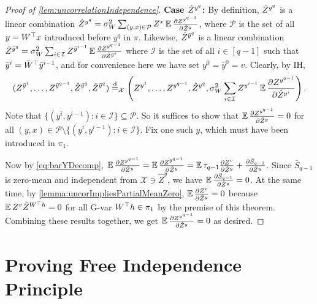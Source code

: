 \documentclass[main.tex]{subfiles}
\begin{document}
\begin{proof}[Proof of \cref{lem:uncorrelationIndependence}]
    \textbf{Case $\dot Z^{y^{q}}$: }By definition, $\dot Z^{y^{q}}$ is a linear combination $\dot Z^{y^{q}}=\sigma_{W}^{2}\sum_{(y,x)\in\mathcal{P}}Z^{x}\operatorname*{\mathbb{E}}\frac{\partial Z^{y^{q-1}}}{\partial\hat{Z}^{y}}$, where $\mathcal{P}$ is the set of all $y=W^{\top}x$ introduced before $y^{q}$ in $\pi$. Likewise, $\dot Z^{\bar{y}^{q}}$ is a linear combination $\dot Z^{\bar{y}^{q}}=\sigma_{W}^{2}\sum_{i\in\mathcal{I}}Z^{\bar{y}^{i-1}}\operatorname*{\mathbb{E}}\frac{\partial Z^{\bar{y}^{q-1}}}{\partial\hat{Z}^{\bar{y}^{i}}}$ where $\mathcal{I}$ is the set of all $i\in[q-1]$ such that $\bar{y}^{i}=\bar{W}^{\top}\bar{y}^{i-1}$, and for convenience here we have set $y^{0}=\bar{y}^{0}=v$. Clearly, by IH, 
    \[
    (Z^{\bar{y}^{1}},\ldots,Z^{\bar{y}^{q-1}},\hat{Z}^{\bar{y}^{q}},\dot Z^{\bar{y}^{q}})\overset{\mathrm{d}}{=}_{\mathcal{X}}\left(Z^{y^{1}},\ldots,Z^{y^{q-1}},\hat{Z}^{y^{q}},\sigma_{W}^{2}\sum_{i\in\mathcal{I}}Z^{y^{i-1}}\operatorname*{\mathbb{E}}\frac{\partial Z^{y^{q-1}}}{\partial\hat{Z}^{y^{i}}}\right).
    \]
    Note that $\{(y^{i},y^{i-1}):i\in\mathcal{I}\}\subseteq\mathcal{P}$. So it suffices to show that $\operatorname*{\mathbb{E}}\frac{\partial Z^{y^{q-1}}}{\partial\hat{Z}^{y}}=0$ for all $(y,x)\in\mathcal{P}\setminus\{(y^{i},y^{i-1}):i\in\mathcal{I}\}$. Fix one such $y$, which must have been introduced in $\pi_{1}$.
    
    Now by \cref{eq:barYDecomp}, $\operatorname*{\mathbb{E}}\frac{\partial Z^{y^{q-1}}}{\partial\hat{Z}^{y}}=\operatorname*{\mathbb{E}}\frac{\partial Z^{\bar{y}^{q-1}}}{\partial\hat{Z}^{y}}=\operatorname*{\mathbb{E}}\tau_{q-1}\frac{\partial Z^{v}}{\partial\hat{Z}^{y}}+\frac{\partial\bar{S}_{q-1}}{\partial\hat{Z}^{y}}$. Since $\bar{S}_{q-1}$ is zero-mean and independent from $\mathcal{X}\ni\hat{Z}^{y}$, we have $\operatorname*{\mathbb{E}}\frac{\partial\bar{S}_{q-1}}{\partial\hat{Z}^{y}}=0$. At the same time, by \cref{lemma:uncorImpliesPartialMeanZero}, $\operatorname*{\mathbb{E}}\frac{\partial Z^{v}}{\partial\hat{Z}^{y}}=0$ because $\operatorname*{\mathbb{E}} Z^{v}\hat{Z}^{W^{\top}h}=0$ for all G-var $W^{\top}h\in\pi_{1}$ by the premise of this theorem. Combining these results together, we get $\operatorname*{\mathbb{E}}\frac{\partial Z^{y^{q-1}}}{\partial\hat{Z}^{y}}=0$ as desired. %
\end{proof}

    
\section{Proving \texorpdfstring{Free Independence Principle}{Free Independence Principle}}
\label{sec:FIP}
\end{document}
